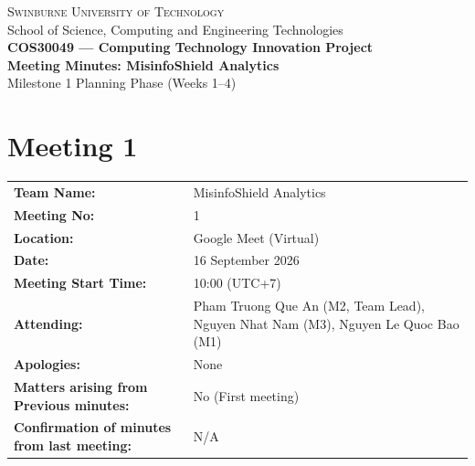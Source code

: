 \documentclass[11pt, a4paper]{article}
\begin{document}
\thispagestyle{empty}

\begin{center}
  {\scshape\large Swinburne University of Technology}\\[2pt]
  {\small School of Science, Computing and Engineering Technologies}\\[8pt]
  {\bfseries\LARGE COS30049 --- Computing Technology Innovation Project}\\[6pt]
  {\Large\textbf{Meeting Minutes: MisinfoShield Analytics}}\\[4pt]
  {\small Milestone 1 Planning Phase (Weeks 1--4)}
\end{center}

\vspace{0.5cm}

\section*{Meeting 1}
\label{sec:meeting1}

\begin{table}[H]
  \centering
  \small
  \begin{tabularx}{\linewidth}{@{}L{3.5cm} Y@{}}
    \toprule
    \textbf{Team Name:} & MisinfoShield Analytics \\
    \textbf{Meeting No:} & 1 \\
    \textbf{Location:} & Google Meet (Virtual) \\
    \textbf{Date:} & 16 September 2026 \\
    \textbf{Meeting Start Time:} & 10:00 (UTC+7) \\
    \textbf{Attending:} & Pham Truong Que An (M2, Team Lead), Nguyen Nhat Nam (M3), Nguyen Le Quoc Bao (M1) \\
    \textbf{Apologies:} & None \\
    \textbf{Matters arising from Previous minutes:} & No (First meeting) \\
    \textbf{Confirmation of minutes from last meeting:} & N/A \\
    \bottomrule
  \end{tabularx}
\end{table}
\end{document}
